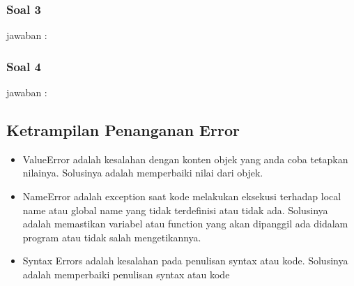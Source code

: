\subsubsection{Soal 3}
jawaban : 

\subsubsection{Soal 4}
jawaban : 

\subsection{Ketrampilan Penanganan Error}
\begin{itemize}
\item ValueError adalah kesalahan dengan konten objek yang anda coba tetapkan nilainya. Solusinya adalah memperbaiki nilai dari objek.

\item NameError adalah exception saat kode melakukan eksekusi terhadap local name atau global name yang tidak terdefinisi atau tidak ada. Solusinya adalah memastikan variabel atau function yang akan dipanggil ada didalam program atau tidak salah mengetikannya.

\item Syntax Errors adalah kesalahan pada penulisan syntax atau kode. Solusinya adalah memperbaiki penulisan syntax atau kode



\end{itemize}